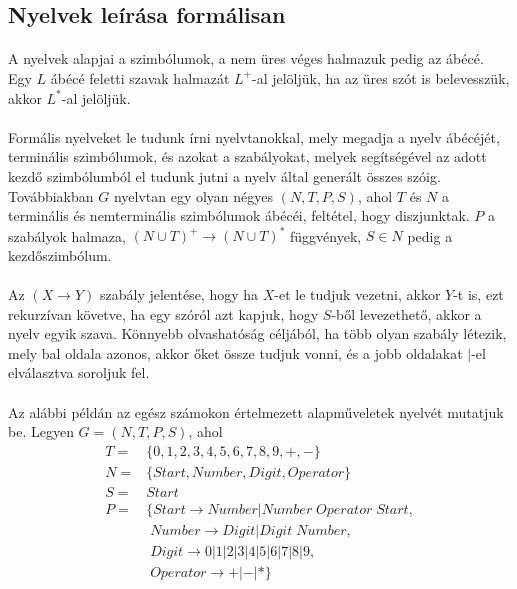 \documentclass[12pt]{report}
\begin{document}
\subsection{Nyelvek leírása formálisan}
\paragraph{}
A nyelvek alapjai a szimbólumok, a nem üres véges halmazuk pedig az ábécé. Egy $L$ ábécé feletti szavak halmazát $L^+$-al jelöljük, ha az üres szót is belevesszük, akkor $L^*$-al jelöljük.
\paragraph{}
Formális nyelveket le tudunk írni nyelvtanokkal, mely megadja a nyelv ábécéjét, terminális szimbólumok, és azokat a szabályokat, melyek segítségével az adott kezdő szimbólumból el tudunk jutni a nyelv által generált összes szóig. Továbbiakban $G$ nyelvtan egy olyan négyes $(N, T, P, S)$, ahol $T$ és $N$ a terminális és nemterminális szimbólumok ábécéi, feltétel, hogy diszjunktak. $P$ a szabályok halmaza, $(N \cup T)^+ \rightarrow (N \cup T)^*$ függvények, $S \in N$ pedig a kezdőszimbólum.
\paragraph{}
Az $(X \rightarrow Y)$ szabály jelentése, hogy ha $X$-et le tudjuk vezetni, akkor $Y$-t is, ezt rekurzívan követve, ha egy szóról azt kapjuk, hogy $S$-ből levezethető, akkor a nyelv egyik szava. Könnyebb olvashatóság céljából, ha több olyan szabály létezik, mely bal oldala azonos, akkor őket össze tudjuk vonni, és a jobb oldalakat $|$-el elválasztva soroljuk fel.
\paragraph{}
Az alábbi példán az egész számokon értelmezett alapműveletek nyelvét mutatjuk be. Legyen $G=(N, T, P, S)$, ahol
$$
\begin{array}{rl}
T= & \{0, 1, 2, 3, 4, 5, 6, 7, 8, 9, +, -\} \\
N= & \{Start, Number, Digit, Operator\} \\
S= & Start \\
P= & \{Start \rightarrow Number | Number \; Operator \; Start, \\
&\; Number \rightarrow Digit | Digit \; Number, \\
&\; Digit \rightarrow 0 | 1 | 2 | 3 | 4 | 5 | 6 | 7 | 8 | 9, \\
&\; Operator \rightarrow + | - | * \}
\end{array}
$$
\end{document}
